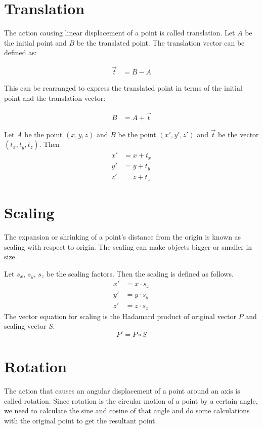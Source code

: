 \section{Translation}
The action causing linear displacement of a point is called translation. Let $A$ be the initial point and $B$ be the translated point. The translation vector can be defined as:

\begin{align*}
\vec{t} &= B - A
\end{align*}

This can be rearranged to express the translated point in terms of the initial point and the translation vector:

\begin{align*}
B &= A + \vec{t}
\end{align*}

Let  $A$ be the point \( (x, y, z) \) and $B$ be the point \( (x', y', z') \) and $\vec{t}$ be the vector \( (t_x, t_y, t_z) \). Then
\begin{equation}
\begin{aligned}
x' &= x + t_x \\
y' &= y + t_y \\
z' &= z + t_z
\end{aligned}
\end{equation}

\section{Scaling}
The expansion or shrinking of a point's distance from the origin is known as scaling with respect to origin. The scaling can make objects bigger or smaller in size. 

Let $s_x$, $s_y$, $s_z$ be the scaling factors. Then the scaling is defined as follows.
\[
\begin{aligned}
x' &= x \cdot s_x \\
y' &= y \cdot s_y \\
z' &= z \cdot s_z
\end{aligned}
\]
The vector equation for scaling is the Hadamard product of original vector $P$ and scaling vector $S$.
\[
P' = P \circ  S
\]

\section{Rotation}
The action that causes an angular displacement of a point around an axis is called rotation. Since rotation is the circular motion of a point by a certain angle, we need to calculate the sine and cosine of that angle and do some calculations with the original point to get the resultant point. 

